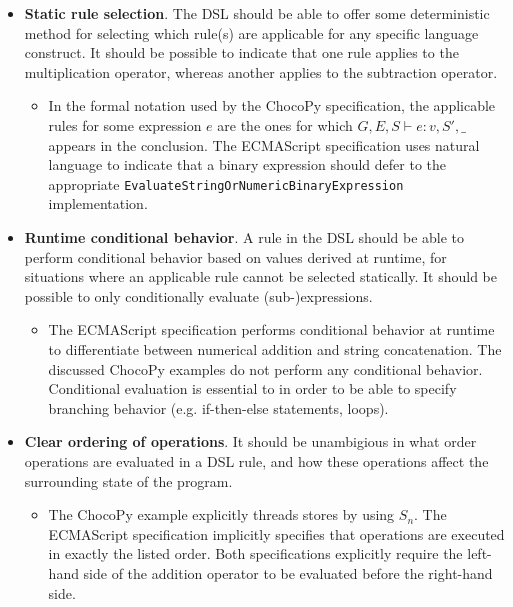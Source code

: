 \begin{itemize}
  \item \textbf{Static rule selection}. The \ac{DSL} should be able to offer some deterministic method for selecting which rule(s) are applicable for any specific language construct. It should be possible to indicate that one rule applies to the multiplication operator, whereas another applies to the subtraction operator.
  \begin{itemize}
    \item In the formal notation used by the ChocoPy specification, the applicable rules for some expression $ e $ are the ones for which $ G, E, S \vdash e : v, S', \_ $ appears in the conclusion. The ECMAScript specification uses natural language to indicate that a binary expression should defer to the appropriate \texttt{Evaluate\hspace{0pt}String\hspace{0pt}Or\hspace{0pt}Numeric\hspace{0pt}Binary\hspace{0pt}Expression} implementation.
  \end{itemize}
  \item \textbf{Runtime conditional behavior}. A rule in the \ac{DSL} should be able to perform conditional behavior based on values derived at runtime, for situations where an applicable rule cannot be selected statically. It should be possible to only conditionally evaluate (sub-)expressions.
  \begin{itemize}
    \item The ECMAScript specification performs conditional behavior at runtime to differentiate between numerical addition and string concatenation. The discussed ChocoPy examples do not perform any conditional behavior. Conditional evaluation is essential to in order to be able to specify branching behavior (e.g. if-then-else statements, loops).
  \end{itemize}
  \item \textbf{Clear ordering of operations}. It should be unambigious in what order operations are evaluated in a \ac{DSL} rule, and how these operations affect the surrounding state of the program.
  \begin{itemize}
    \item The ChocoPy example explicitly threads stores by using $ S_n $. The ECMAScript specification implicitly specifies that operations are executed in exactly the listed order. Both specifications explicitly require the left-hand side of the addition operator to be evaluated before the right-hand side.

\end{itemize}
\end{itemize}
